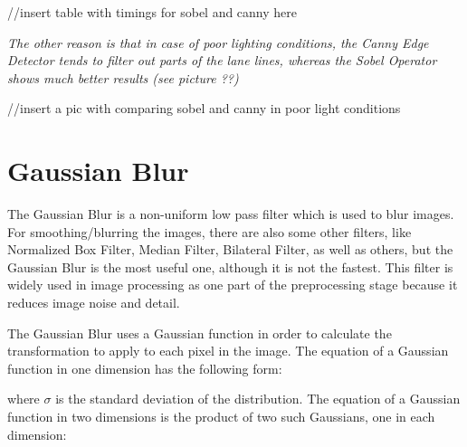 //insert table with timings for sobel and canny here

\emph{\color{blue}The other reason is that in case of poor lighting conditions, the Canny Edge Detector tends to filter out parts of the lane lines, whereas the Sobel Operator shows much better results (see picture ??)}

//insert a pic with comparing sobel and canny in poor light conditions 



%
\section{Gaussian Blur}\label{sec:Gaussian Blur}

The Gaussian Blur is a non-uniform low pass filter which is used to blur images. For smoothing/blurring the images, there are also some other filters, like Normalized Box Filter, Median Filter, Bilateral Filter, as well as others, but the Gaussian Blur is the most useful one, although it is not the fastest. This filter is widely used in image processing as one part of the preprocessing stage because it reduces image noise and detail.

The Gaussian Blur uses a Gaussian function in order to calculate the transformation to apply to each pixel in the image. The equation of a Gaussian function in one dimension has the following form: 

 \begin{center}
\end{center}

where $ \sigma $ is the standard deviation of the distribution. The equation of a Gaussian function in two dimensions is the product of two such Gaussians, one in each dimension: 

 \begin{center}
\emph{\color{green}}
\end{center}



